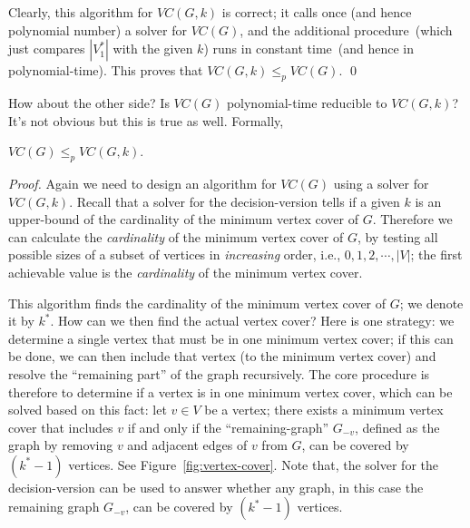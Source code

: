Clearly, this algorithm for $VC(G, k)$ is correct; it calls once (and hence polynomial number)
a solver for $VC(G)$, and the additional procedure~(which just compares $|V_1^*|$ with the given $k$)
runs in constant time~(and hence in polynomial-time). This proves that $VC(G, k)\le_p VC(G)$. \qed

How about the other side? Is $VC(G)$ polynomial-time reducible to $VC(G, k)$? It's not obvious but 
this is true as well. Formally,
\begin{fact}
$VC(G)\le_p VC(G, k)$.
\end{fact}
\emph{Proof.}  Again we need to design an algorithm for $VC(G)$ using a solver for $VC(G, k)$.
Recall that a solver for the decision-version tells if a given $k$ is an upper-bound of the
cardinality of the minimum vertex cover of $G$. 
Therefore we can calculate the \emph{cardinality} of the minimum vertex cover of $G$,
by testing all possible sizes of a subset of vertices in \emph{increasing} order,
   i.e., $0, 1, 2, \cdots, |V|$;
the first achievable value is the \emph{cardinality} of the minimum vertex cover.

\begin{minipage}{0.8\textwidth}
	\xxx
	\xxx
	\xxx
	\xxx
	\xxx
	\xxx
\end{minipage}

This algorithm finds the cardinality of the minimum vertex cover of $G$; we denote it by $k^*$.
How can we then find the actual vertex cover? Here is one strategy:
we determine a single vertex that must be in one minimum vertex cover; if
this can be done, we can then
include that vertex (to the minimum vertex cover) and resolve the ``remaining part'' of the graph recursively.
The core procedure is therefore to determine if a vertex is in one minimum vertex cover,
which can be solved based on this fact: let $v\in V$ be a vertex; 
there exists a minimum vertex cover that includes $v$
if and only if the ``remaining-graph'' $G_{-v}$, defined as the graph by removing $v$ and adjacent edges of $v$ from $G$, can
be covered by $(k^* - 1)$ vertices. 
See Figure~\ref{fig:vertex-cover}.  
Note that, the solver for the decision-version can be used to answer 
whether any graph, in this case the remaining graph $G_{-v}$, can be covered by $(k^* - 1)$ vertices. 

